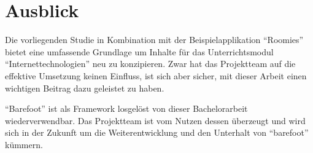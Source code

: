 \section{Ausblick}

Die vorliegenden Studie in Kombination mit der Beispielapplikation ``Roomies'' bietet eine umfassende Grundlage um Inhalte für das Unterrichtsmodul ``Internettechnologien'' neu zu konzipieren. Zwar hat das Projektteam auf die effektive Umsetzung keinen Einfluss, ist sich aber sicher, mit dieser Arbeit einen wichtigen Beitrag dazu geleistet zu haben.

``Barefoot'' ist als Framework losgelöst von dieser Bachelorarbeit wiederverwendbar. Das Projektteam ist vom Nutzen dessen überzeugt und wird sich in der Zukunft um die Weiterentwicklung und den Unterhalt von ``barefoot'' kümmern.